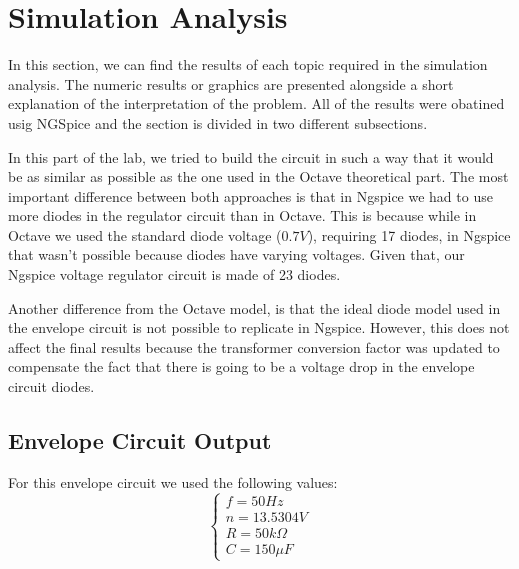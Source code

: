 \section{Simulation Analysis}
\label{sec:simulation}

In this section, we can find the results of each topic required in the simulation analysis. The numeric results or graphics are presented alongside a short explanation of the interpretation of the problem. All of the results were obatined usig NGSpice and the section is divided in two different subsections. 

In this part of the lab, we tried to build the circuit in such a way that it would be as similar as possible as the one used in the Octave theoretical part. The most important difference between both approaches is that in Ngspice we had to use more diodes in the regulator circuit than in Octave. This is because while in Octave we used the standard diode voltage ($0.7 V$), requiring 17 diodes, in Ngspice that wasn't possible because diodes have varying voltages. Given that, our Ngspice voltage regulator circuit is made of 23 diodes.

Another difference from the Octave model, is that the ideal diode model used in the envelope circuit is not possible to replicate in Ngspice. However, this does not affect the final results because the transformer conversion factor was updated to compensate the fact that there is going to be a voltage drop in the envelope circuit diodes.

\subsection{Envelope Circuit Output}


For this envelope circuit we used the following values:
\[
\left\{\begin{matrix}
f = 50 Hz\\
n=13.5304 V\\
R=50k\Omega\\
C=150 \mu F
\end{matrix}\right.
\]

